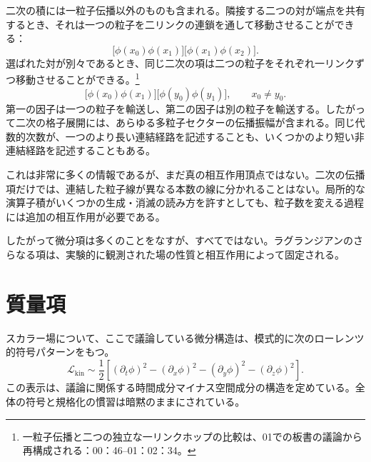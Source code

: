 二次の積には一粒子伝播以外のものも含まれる。隣接する二つの対が端点を共有するとき、それは一つの粒子を二リンクの連鎖を通して移動させることができる：
\begin{equation}
\bigl[\phi(x_0)\phi(x_1)\bigr]
\bigl[\phi(x_1)\phi(x_2)\bigr].
\end{equation}
選ばれた対が別々であるとき、同じ二次の項は二つの粒子をそれぞれ一リンクずつ移動させることができる。\footnote{一粒子伝播と二つの独立な一リンクホップの比較は、01での板書の議論から再構成される：00：46--01：02：34。}
\begin{equation}
\bigl[\phi(x_0)\phi(x_1)\bigr]
\bigl[\phi(y_0)\phi(y_1)\bigr],
\qquad x_0\neq y_0.
\end{equation}
第一の因子は一つの粒子を輸送し、第二の因子は別の粒子を輸送する。したがって二次の格子展開には、あらゆる多粒子セクターの伝播振幅が含まれる。同じ代数的次数が、一つのより長い連結経路を記述することも、いくつかのより短い非連結経路を記述することもある。

これは非常に多くの情報であるが、まだ真の相互作用頂点ではない。二次の伝播項だけでは、連結した粒子線が異なる本数の線に分かれることはない。局所的な演算子積がいくつかの生成・消滅の読み方を許すとしても、粒子数を変える過程には追加の相互作用が必要である。

\begin{classroomqa}
\end{classroomqa}


したがって微分項は多くのことをなすが、すべてではない。ラグランジアンのさらなる項は、実験的に観測された場の性質と相互作用によって固定される。

\section{質量項}

スカラー場について、ここで議論している微分構造は、模式的に次のローレンツ的符号パターンをもつ。
\begin{equation}
\mathcal{L}_{\mathrm{kin}}
\sim
\frac{1}{2}\left[
(\partial_t\phi)^2
-(\partial_x\phi)^2
-(\partial_y\phi)^2
-(\partial_z\phi)^2
\right].
\end{equation}
この表示は、議論に関係する時間成分マイナス空間成分の構造を定めている。全体の符号と規格化の慣習は暗黙のままにされている。

